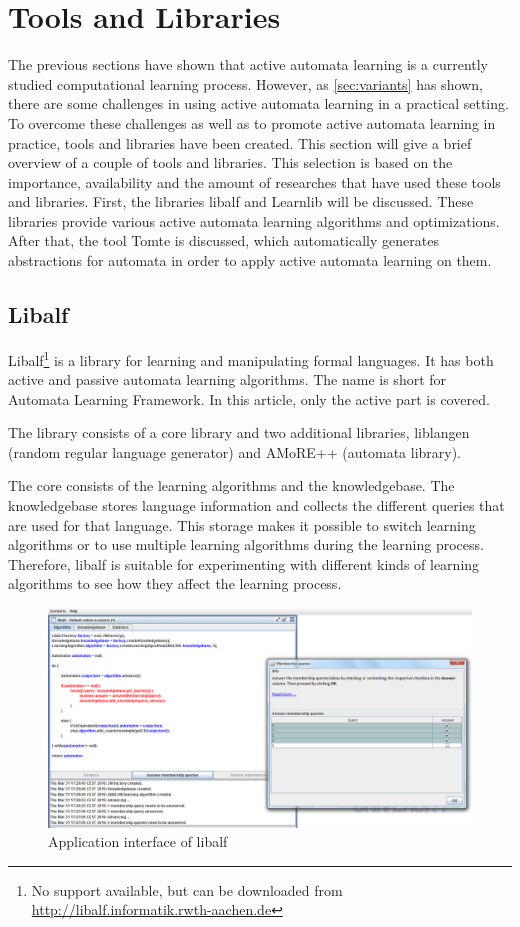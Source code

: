 \section{Tools and Libraries}
\label{sec:tools}
The previous sections have shown that active automata learning is a currently
studied computational learning process. However, as \cref{sec:variants} has
shown, there are some challenges in using active automata learning in a
practical setting. To overcome these challenges as well as to promote active
automata learning in practice, tools and libraries have been created. This
section will give a brief overview of a couple of tools and libraries. This
selection is based on the importance, availability and the amount of researches
that have used these tools and libraries. First, the libraries libalf and
Learnlib will be discussed. These libraries provide various active automata
learning algorithms and optimizations. After that, the tool Tomte is discussed,
which automatically generates abstractions for automata in order to apply active
automata learning on them.


\subsection{Libalf}
\label{sssec:libalf}
Libalf\footnote{No support available, but can be downloaded from 
\url{http://libalf.informatik.rwth-aachen.de}} is a library for learning and 
manipulating formal languages. It has both active and passive automata learning 
algorithms. The name is short for Automata Learning Framework. In this article, 
only the active part is covered.

The library consists of a core library and two additional libraries, 
liblangen (random regular language generator) and AMoRE++ (automata library).

The core consists of the learning algorithms and the knowledgebase. The 
knowledgebase stores language information and collects the different queries 
that are used for that language. This storage makes it possible to switch 
learning algorithms or to use multiple learning algorithms during the learning 
process. Therefore, libalf is suitable for experimenting with different kinds 
of learning algorithms to see how they affect the learning process. 

\begin{figure}[!ht]
	\includegraphics[width=\textwidth]{Tool_images/libalf_demo_interface.png}
	\caption{Application interface of libalf}
	\label{fig:libalf_interface}
\end{figure}

